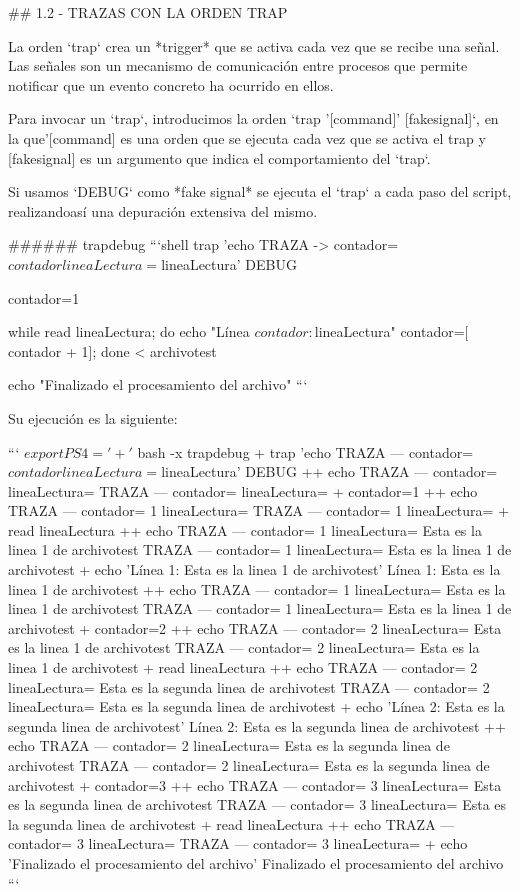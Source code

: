 ## 1.2 - TRAZAS CON LA ORDEN TRAP

La orden `trap` crea un *trigger* que se activa cada vez que se recibe una señal. Las señales son un mecanismo de comunicación entre procesos que permite notificar que un evento concreto ha ocurrido en ellos.

Para invocar un `trap`, introducimos la orden `trap '[command]' [fakesignal]`, en la que'[command] es una orden que se ejecuta cada vez que se activa el trap y [fakesignal] es un argumento que indica el comportamiento del `trap`.

Si usamos `DEBUG` como *fake signal* se ejecuta el `trap` a cada paso del script, realizandoasí una depuración extensiva del mismo.

###### trapdebug
```shell
trap 'echo TRAZA -> contador= $contador lineaLectura= $lineaLectura' DEBUG

contador=1

while read lineaLectura; do
   echo "Línea $contador: $lineaLectura"
   contador=$[ $contador + 1];
done < archivotest

echo "Finalizado el procesamiento del archivo"
```

Su ejecución es la siguiente:

```
$ export PS4='+ '
$ bash -x trapdebug
  + trap 'echo TRAZA --- contador= $contador lineaLectura= $lineaLectura' DEBUG
  ++ echo TRAZA --- contador= lineaLectura=
  TRAZA --- contador= lineaLectura=
  + contador=1
  ++ echo TRAZA --- contador= 1 lineaLectura=
  TRAZA --- contador= 1 lineaLectura=
  + read lineaLectura
  ++ echo TRAZA --- contador= 1 lineaLectura= Esta es la linea 1 de archivotest
  TRAZA --- contador= 1 lineaLectura= Esta es la linea 1 de archivotest
  + echo 'Línea 1: Esta es la linea 1 de archivotest'
  Línea 1: Esta es la linea 1 de archivotest
  ++ echo TRAZA --- contador= 1 lineaLectura= Esta es la linea 1 de archivotest
  TRAZA --- contador= 1 lineaLectura= Esta es la linea 1 de archivotest
  + contador=2
  ++ echo TRAZA --- contador= 2 lineaLectura= Esta es la linea 1 de archivotest
  TRAZA --- contador= 2 lineaLectura= Esta es la linea 1 de archivotest
  + read lineaLectura
  ++ echo TRAZA --- contador= 2 lineaLectura= Esta es la segunda linea de archivotest
  TRAZA --- contador= 2 lineaLectura= Esta es la segunda linea de archivotest
  + echo 'Línea 2: Esta es la segunda linea de archivotest'
  Línea 2: Esta es la segunda linea de archivotest
  ++ echo TRAZA --- contador= 2 lineaLectura= Esta es la segunda linea de archivotest
  TRAZA --- contador= 2 lineaLectura= Esta es la segunda linea de archivotest
  + contador=3
  ++ echo TRAZA --- contador= 3 lineaLectura= Esta es la segunda linea de archivotest
  TRAZA --- contador= 3 lineaLectura= Esta es la segunda linea de archivotest
  + read lineaLectura
  ++ echo TRAZA --- contador= 3 lineaLectura=
  TRAZA --- contador= 3 lineaLectura=
  + echo 'Finalizado el procesamiento del archivo'
  Finalizado el procesamiento del archivo
```

